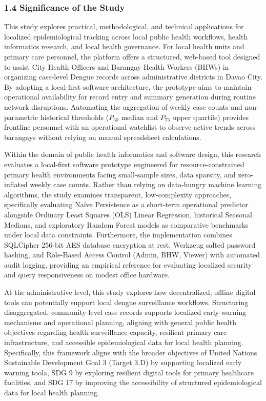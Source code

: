 \documentclass[
]{article}
\begin{document}
\subsubsection{\texorpdfstring{\textbf{1.4 Significance of the
Study}}{1.4 Significance of the Study}}\label{significance-of-the-study}

This study explores practical, methodological, and technical
applications for localized epidemiological tracking across local public
health workflows, health informatics research, and local health
governance. For local health units and primary care personnel, the
platform offers a structured, web-based tool designed to assist City
Health Officers and Barangay Health Workers (BHWs) in organizing
case-level Dengue records across administrative districts in Davao City.
By adopting a local-first software architecture, the prototype aims to
maintain operational availability for record entry and summary
generation during routine network disruptions. Automating the
aggregation of weekly case counts and non-parametric historical
thresholds (\(P_{50}\) median and \(P_{75}\) upper quartile) provides
frontline personnel with an operational watchlist to observe active
trends across barangays without relying on manual spreadsheet
calculations.

Within the domain of public health informatics and software design, this
research evaluates a local-first software prototype engineered for
resource-constrained primary health environments facing small-sample
sizes, data sparsity, and zero-inflated weekly case counts. Rather than
relying on data-hungry machine learning algorithms, the study examines
transparent, low-complexity approaches, specifically evaluating Naïve
Persistence as a short-term operational predictor alongside Ordinary
Least Squares (OLS) Linear Regression, historical Seasonal Medians, and
exploratory Random Forest models as comparative benchmarks under local
data constraints. Furthermore, the implementation combines SQLCipher
256-bit AES database encryption at rest, Werkzeug salted password
hashing, and Role-Based Access Control (Admin, BHW, Viewer) with
automated audit logging, providing an empirical reference for evaluating
localized security and query responsiveness on modest office hardware.

At the administrative level, this study explores how decentralized,
offline digital tools can potentially support local dengue surveillance
workflows. Structuring disaggregated, community-level case records
supports localized early-warning mechanisms and operational planning,
aligning with general public health objectives regarding health
surveillance capacity, resilient primary care infrastructure, and
accessible epidemiological data for local health planning. Specifically,
this framework aligns with the broader objectives of United Nations
Sustainable Development Goal 3 (Target 3.D) by supporting localized
early warning toola, SDG 9 by exploring resilient digital tools for
primary healthcare facilities, and SDG 17 by improving the accessibility
of structured epidemiological data for local health planning.
\end{document}
